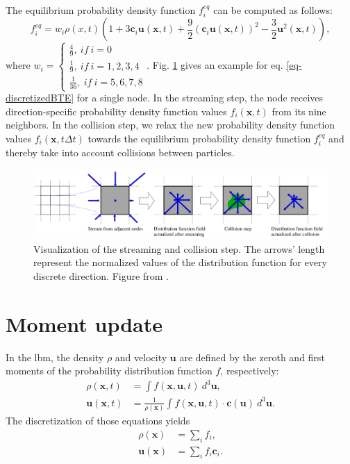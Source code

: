 \documentclass[a4paper,11pt, footsepline]{book}
\begin{document}
The equilibrium probability density function $f_{i}^{eq}$ can be computed as follows:
\begin{equation}
\label{eq-equilibrium}
f_{i}^{eq}=w_{i}\rho(x,t)(1+3\mathbf{c}_{i}\mathbf{u}(\mathbf{x},t)+\frac{9}{2}(\mathbf{c}_{i}\mathbf{u}(\mathbf{x},t))^{2}-\frac{3}{2}\mathbf{u}^{2}(\mathbf{x},t)),
\end{equation}
where $w_{i}=
\begin{cases}
\frac{4}{9}, ~if~i=0\\
\frac{1}{9}, ~if~i=1,2,3,4\\
\frac{1}{36}, ~if~i=5,6,7,8
\end{cases}$. Fig. \ref{fig:streamingCollisionVis} gives an example for eq. \ref{eq-discretizedBTE} for a single node. In the streaming step, the node receives direction-specific probability density function values $f_{i}(\mathbf{x},t)$ from its nine neighbors. In the collision step, we relax the new probability density function values $f_{i}(\mathbf{x},t\Delta t)$ towards the equilibrium probability density function $f^{eq}_{i}$ and thereby take into account collisions between particles.
\begin{figure}
  \begin{center}
   \includegraphics[width=\textwidth]{../figures/lbm/vis.png}
   \caption{Visualization of the streaming and collision step. The arrows' length represent the normalized values of the distribution function for every discrete direction. Figure from \cite{Boix.2013}.}
  \label{fig:streamingCollisionVis}
  \end{center}
\end{figure}
\section{Moment update}\label{sec-momentUpdate}
In the \ac{lbm}, the density $\rho$ and velocity $\mathbf{u}$ are defined by the zeroth and first moments of the probability distribution function $f$, respectively:
\begin{align} 
\rho(\mathbf{x},t) &=  \int f(\mathbf{x}, \mathbf{u},t)~d^{3}\mathbf{u}, \\ 
\mathbf{u}(\mathbf{x},t) &=  \frac{1}{\rho(\mathbf{x})}\int f(\mathbf{x}, \mathbf{u},t)\cdot\mathbf{c}(\mathbf{u})~d^{3}\mathbf{u}.
\end{align}
The discretization of those equations yields
\begin{align}
\label{eq-density}
\rho(\mathbf{x}) &=  \sum\limits_{i} f_{i}, \\ 
\label{eq-velocity}
\mathbf{u}(\mathbf{x}) &=  \sum\limits_{i} f_{i}\mathbf{c}_{i}.
\end{align}
\end{document}
